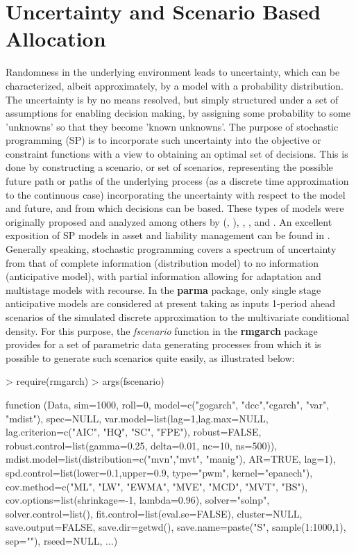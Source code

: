 \section{Uncertainty and Scenario Based Allocation}\label{sec:1}
Randomness in the underlying environment leads to uncertainty, which can be
characterized, albeit approximately, by a model with a probability
distribution. The uncertainty is by no means resolved, but simply structured
under a set of assumptions for enabling decision making, by assigning some
probability to some 'unknowns' so that they become 'known unknowns'. The
purpose of stochastic programming (SP) is to incorporate such uncertainty
into the objective or constraint functions with a view to obtaining an
optimal set of decisions. This is done by constructing a scenario, or set of
scenarios, representing the possible future path or paths of the underlying
process (as a discrete time approximation to the continuous case)
incorporating the uncertainty with respect to the model and future, and from
which decisions can be based. These types of models were originally proposed
and analyzed among others by \citeauthor{Dantzig1956} (\citeyear{Dantzig1956},
\citeyear{Dantzig1992}), \citet{Beale1955}, \citet{Dantzig1993},
\citet{Madansky1962} and \citet{Charnes1959}. An excellent
exposition of SP models in asset and liability management can be found in
\citet{Kouwenberg2006}. Generally speaking, stochastic programming
covers a spectrum of uncertainty from that of complete information
(distribution model) to no information (anticipative model), with partial
information allowing for adaptation and multistage models with recourse. In
the \textbf{parma} package, only single stage anticipative models are
considered at present taking as inputs 1-period ahead scenarios of the
simulated discrete approximation to the multivariate conditional density.
For this purpose, the \emph{fscenario} function in the \textbf{rmgarch}
package provides for a set of parametric data generating processes from which
it is possible to generate such scenarios quite easily, as illustrated below:\\
\newline
\begin{Schunk}
\begin{Sinput}
> require(rmgarch)
> args(fscenario)
\end{Sinput}
\begin{Soutput}
function (Data, sim=1000, roll=0,
    model=c("gogarch", "dcc","cgarch", "var", "mdist"), spec=NULL,
    var.model=list(lag=1,lag.max=NULL,
        lag.criterion=c("AIC", "HQ", "SC", "FPE"), robust=FALSE,
        robust.control=list(gamma=0.25, delta=0.01, nc=10, ns=500)),
    mdist.model=list(distribution=c("mvn","mvt", "manig"), AR=TRUE, lag=1),
    spd.control=list(lower=0.1,upper=0.9, type="pwm", kernel="epanech"),
    cov.method=c("ML", "LW", "EWMA", "MVE", "MCD", "MVT", "BS"),
    cov.options=list(shrinkage=-1, lambda=0.96), solver="solnp",
    solver.control=list(), fit.control=list(eval.se=FALSE),
    cluster=NULL, save.output=FALSE, save.dir=getwd(),
    save.name=paste("S", sample(1:1000,1), sep=""), rseed=NULL, ...)
\end{Soutput}
\end{Schunk}
